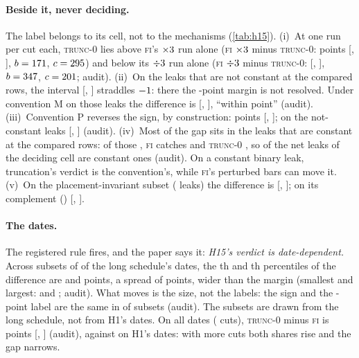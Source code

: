 \documentclass[11pt]{article}
\newcommand{\FI}{\textsc{fi}}
\newcommand{\TZ}{\textsc{trunc-0}}
\begin{document}
\paragraph{Beside it, never deciding.} The label belongs to its cell, not to the mechanisms
(\cref{tab:h15}).
(i)~At one run per cut each, \TZ{} lies above \FI's $\times3$ run alone (\FI{}
$\times3$ minus \TZ: \NumCEqFiUpTzDiff{} points [\NumCEqFiUpTzLo, \NumCEqFiUpTzHi],
$b = 171$, $c = 295$) and below its $\div3$ run alone (\FI{}
$\div3$ minus \TZ: \NumDownDiff{} [\NumDownLo, \NumDownHi], $b = 347$,
$c = 201$; audit).
(ii)~On the leaks that are not constant at the compared rows, the interval [\NumCQNcLo, \NumCQNcHi]
straddles $-1$: there the \NumHfifteenMargin-point margin is not resolved. Under
convention M on those leaks the difference is \NumMNcDiff{} [\NumMNcLo, \NumMNcHi], ``within
\NumHfifteenMargin{} point'' (audit).
(iii)~Convention P reverses the sign, by construction: \NumCBPDiff{} points [\NumCBPLo, \NumCBPHi];
on the not-constant leaks \NumPNcDiff{} [\NumPNcLo, \NumPNcHi] (audit).
(iv)~Most of the gap sits in the leaks that are constant at the compared rows: of those
\NumConstLeaks, \FI{} catches \NumConstFI{} and \TZ{} \NumConstTz, so \NumConstShare{} of the net
\NumNetGap{} leaks of the deciding cell are constant ones (audit). On a constant binary leak,
truncation's verdict is the convention's, while \FI's perturbed bars can move it.
(v)~On the placement-invariant subset (\NumCInvLeaks{} leaks) the difference is \NumCInvDiff{}
[\NumCInvLo, \NumCInvHi]; on its complement (\NumCCompLeaks) \NumCCompDiff{} [\NumCCompLo,
\NumCCompHi].

\paragraph{The dates.} The registered rule fires, and the paper says it: \emph{H15's verdict is
date-dependent.} Across \NumCBootSubsets{} subsets of \NumCBootPer{} of the long schedule's
\NumCBootDates{} dates, the \NumBootPLo th and \NumBootPHi th percentiles of the difference are
\NumCBootLo{} and \NumCBootHi{} points, a spread of \NumCBootSpread{} points, wider than the margin
(smallest and largest: \NumCBootMin{} and \NumCBootMax; audit). What moves is the size, not the
labels: the sign and the \NumHfifteenMargin-point label are the same in \NumLabelsSame{} of
\NumLabelsOf{} subsets (audit). The subsets are drawn from the long schedule, not from H1's dates.
On all \NumLongDates{} dates (\NumLongCuts{} cuts), \TZ{} minus \FI{} is \NumLongDiff{} points
[\NumLongLo, \NumLongHi] (audit), against \NumCHDiff{} on H1's \NumCutDates{} dates: with more cuts
both shares rise and the gap narrows.
\end{document}
